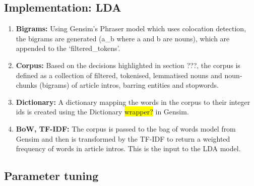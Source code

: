 \subsection{Implementation: LDA}
\begin{enumerate}
    \item \textbf{Bigrams:} Using Gensim’s Phraser model which uses colocation detection, the bigrams are generated (a\_b where a and b are nouns), which are appended to the ‘filtered\_tokens’.
    \item \textbf{Corpus:} Based on the decisions highlighted in section ???, the corpus is defined as a collection of filtered, tokenised, lemmatised nouns and noun-chunks (bigrams) of article intros, barring entities and stopwords.
    
    
    \item \textbf{Dictionary:} A dictionary mapping the words in the corpus to their integer ids is created using the Dictionary \hl{wrapper?} in Gensim. 
    \item \textbf{BoW, TF-IDF:} The corpus is passed to the bag of words model from Gensim and then is transformed by the TF-IDF to return a weighted frequency of words in article intros. This is the input to the LDA model. 
\end{enumerate}


\subsection{Parameter tuning}


